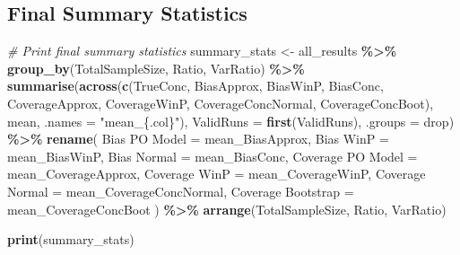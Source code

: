 \documentclass[
  letterpaper,
  DIV=11,
  numbers=noendperiod]{scrartcl}
\newenvironment{Shaded}{\begin{snugshade}}{\end{snugshade}}
\newcommand{\AttributeTok}[1]{\textcolor[rgb]{0.13,0.29,0.53}{#1}}
\newcommand{\CommentTok}[1]{\textcolor[rgb]{0.56,0.35,0.01}{\textit{#1}}}
\newcommand{\FunctionTok}[1]{\textcolor[rgb]{0.13,0.29,0.53}{\textbf{#1}}}
\newcommand{\NormalTok}[1]{#1}
\newcommand{\OtherTok}[1]{\textcolor[rgb]{0.56,0.35,0.01}{#1}}
\newcommand{\SpecialCharTok}[1]{\textcolor[rgb]{0.81,0.36,0.00}{\textbf{#1}}}
\newcommand{\StringTok}[1]{\textcolor[rgb]{0.31,0.60,0.02}{#1}}
\begin{document}
\subsection{Final Summary Statistics}\label{final-summary-statistics}

\begin{Shaded}
\begin{Highlighting}[]
\CommentTok{\# Print final summary statistics}
\NormalTok{summary\_stats }\OtherTok{\textless{}{-}}\NormalTok{ all\_results }\SpecialCharTok{\%\textgreater{}\%}
  \FunctionTok{group\_by}\NormalTok{(TotalSampleSize, Ratio, VarRatio) }\SpecialCharTok{\%\textgreater{}\%}
  \FunctionTok{summarise}\NormalTok{(}\FunctionTok{across}\NormalTok{(}\FunctionTok{c}\NormalTok{(TrueConc, }
\NormalTok{                     BiasApprox, }
\NormalTok{                     BiasWinP, }
\NormalTok{                     BiasConc,}
\NormalTok{                     CoverageApprox, }
\NormalTok{                     CoverageWinP, }
\NormalTok{                     CoverageConcNormal, }
\NormalTok{                     CoverageConcBoot), }
\NormalTok{                   mean, }\AttributeTok{.names =} \StringTok{"mean\_\{.col\}"}\NormalTok{),}
            \AttributeTok{ValidRuns =} \FunctionTok{first}\NormalTok{(ValidRuns),}
            \AttributeTok{.groups =} \StringTok{\textquotesingle{}drop\textquotesingle{}}\NormalTok{) }\SpecialCharTok{\%\textgreater{}\%}
  \FunctionTok{rename}\NormalTok{(}
    \StringTok{\textasciigrave{}}\AttributeTok{Bias PO Model}\StringTok{\textasciigrave{}} \OtherTok{=}\NormalTok{ mean\_BiasApprox,}
\StringTok{\textasciigrave{}}\AttributeTok{Bias WinP}\StringTok{\textasciigrave{}} \OtherTok{=}\NormalTok{ mean\_BiasWinP,}
    \StringTok{\textasciigrave{}}\AttributeTok{Bias Normal}\StringTok{\textasciigrave{}} \OtherTok{=}\NormalTok{ mean\_BiasConc,}
    \StringTok{\textasciigrave{}}\AttributeTok{Coverage PO Model}\StringTok{\textasciigrave{}} \OtherTok{=}\NormalTok{ mean\_CoverageApprox,}
    \StringTok{\textasciigrave{}}\AttributeTok{Coverage WinP}\StringTok{\textasciigrave{}} \OtherTok{=}\NormalTok{ mean\_CoverageWinP,}
    \StringTok{\textasciigrave{}}\AttributeTok{Coverage Normal}\StringTok{\textasciigrave{}} \OtherTok{=}\NormalTok{ mean\_CoverageConcNormal,}
    \StringTok{\textasciigrave{}}\AttributeTok{Coverage Bootstrap}\StringTok{\textasciigrave{}} \OtherTok{=}\NormalTok{ mean\_CoverageConcBoot}
\NormalTok{  ) }\SpecialCharTok{\%\textgreater{}\%}
  \FunctionTok{arrange}\NormalTok{(TotalSampleSize, Ratio, VarRatio)}

\FunctionTok{print}\NormalTok{(summary\_stats)}
\end{Highlighting}
\end{Shaded}
\end{document}
